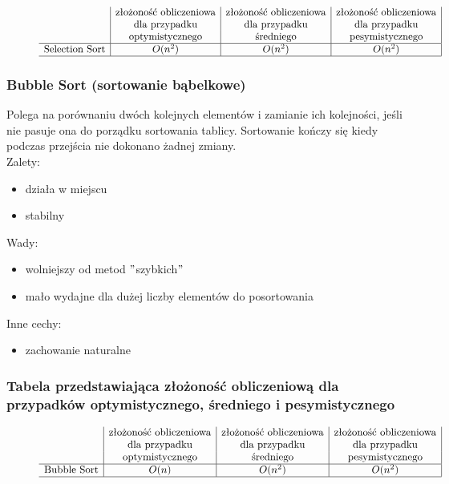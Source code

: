 \documentclass[polish,polish,a4paper]{article}
\begin{document}
\begin{spacing}{1.5}
\begin{figure}[H]
\begin{equation*}
\begin{array}{l|c|c|c|}
		&$złożoność obliczeniowa$&$złożoność obliczeniowa$&$złożoność obliczeniowa$\\
		&$dla przypadku$&$dla przypadku$&$dla przypadku$\\
		&$optymistycznego$&$średniego$&$pesymistycznego$\\
		\hline
		$Selection Sort$&O(n^2)&O(n^2)&O(n^2)\\
		\hline
		\end{array}
		\end{equation*}
	\end{figure}
	
	
			\subsubsection*{Bubble Sort (sortowanie bąbelkowe)}
			Polega na porównaniu dwóch kolejnych elementów i zamianie ich kolejności, jeśli nie pasuje ona do porządku sortowania tablicy. Sortowanie kończy się kiedy podczas przejścia nie dokonano żadnej zmiany.\\
			
	Zalety:
	\begin{itemize}
		\item działa w miejscu
		\item stabilny 
	\end{itemize}
	Wady:
	\begin{itemize}
		\item wolniejszy od metod $ " $szybkich$ " $
		\item mało wydajne dla dużej liczby elementów do posortowania
	\end{itemize}
	Inne cechy:
	\begin{itemize}
		\item zachowanie naturalne
	\end{itemize}
	
	
	\subsubsection*{Tabela przedstawiająca złożoność obliczeniową dla przypadków optymistycznego, średniego i pesymistycznego} 
	
	\begin{figure}[H]
			\begin{equation*}
		\begin{array}{l|c|c|c|}

		&$złożoność obliczeniowa$&$złożoność obliczeniowa$&$złożoność obliczeniowa$\\
		&$dla przypadku$&$dla przypadku$&$dla przypadku$\\
		&$optymistycznego$&$średniego$&$pesymistycznego$\\
		\hline
		$Bubble Sort$&O(n)&O(n^2)&O(n^2)\\
		\hline
		\end{array}
		\end{equation*}
	\end{figure}


\end{spacing}
\end{document}
